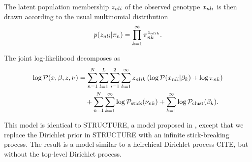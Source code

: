 \begin{ex}
The latent population membership $z_{nli}$ of the observed genotype
$x_{nli}$ is then drawn according to the usual multinomial distribution
\begin{align*}
p(z_{nli} | \pi_n) = \prod_{k=1}^{\infty} \pi_{nk}^{z_{nlik}}.
\end{align*}

The joint log-likelihood decomposes as
\begin{align*}
\log \mathcal{P}(x, \beta, z, \nu) &=
\sum_{n=1}^N \sum_{l=1}^L \sum_{i = 1}^2 \sum_{k=1}^{\infty}
        z_{nlik} \left(
            \log \mathcal{P}(x_{nli} \vert \beta_{k}) + \log \pi_{nk}
        \right)
\nonumber\\&
    \quad +
    \sum_{n=1}^N \sum_{k=1}^{\infty} \log \mathcal{P}_{\mathrm{stick}}(\nu_{nk})
    + \sum_{k=1}^{\infty} \log \mathcal{P}_{\mathrm{clust}}(\beta_{k}).
\end{align*}

This model is identical to STRUCTURE,
a model proposed in \citet{pritchard:2000:structure, raj:2014:faststructure},
except that we replace the Dirichlet prior in STRUCTURE
with an infinite stick-breaking process.
The result is a model similar to a heirchical Dirichlet process CITE,
but without the top-level Dirichlet process.

\end{ex}


